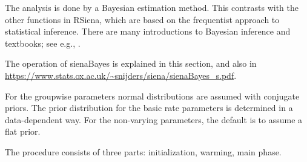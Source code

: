 \documentclass[a4paper,fleqn,11pt]{article}
\newcommand{\+}{\, + \,}
\newcommand{\rs}{{\sf RSiena}}
\begin{document}
  The analysis is done by a Bayesian estimation method.
  This contrasts with the other functions in \rs, which are based on the
  frequentist approach to statistical inference.
  There are many introductions to Bayesian inference and textbooks; see e.g.,
  \citet{KaplanDepaoli2013,Gill2015,DonovanMickey2019}.
  \medskip

  The operation of \textsf{sienaBayes} is explained in this section,
  and also in \url{https://www.stats.ox.ac.uk/~snijders/siena/sienaBayes_s.pdf}.

  For the groupwise parameters normal distributions are assumed with conjugate
  priors. The prior distribution for the basic rate parameters is determined
  in a data-dependent way. For the non-varying parameters,
  the default is to assume a flat prior.

  The procedure consists of three parts: initialization, warming,
  main phase.
\end{document}
